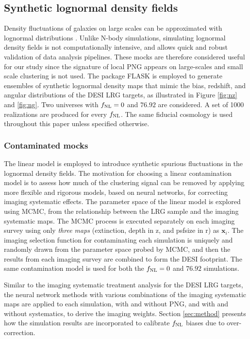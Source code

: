 \subsection{Synthetic lognormal density fields}\label{ssec:mocks}
Density fluctuations of galaxies on large scales can be approximated with lognormal distributions \citep{coles1991}. Unlike N-body simulations, simulating lognormal density fields is not computationally intensive, and allows quick and robust validation of data analysis pipelines. These mocks are therefore considered useful for our study since the signature of local PNG appears on large-scales and small scale clustering is not used. The package \textsc{FLASK} \citep[Full-sky Lognormal Astro-fields Simulation Kit;][]{Xavier_2016} is employed to generate ensembles of synthetic lognormal density maps that mimic the bias, redshift, and angular distributions of the DESI LRG targets, as illustrated in Figure \ref{fig:nz} and \ref{fig:ng}. Two universes with $f_{\rm NL}=0$ and $76.92$ are considered. A set of 1000 realizations are produced for every $f_{\rm NL}$.  The same fiducial cosmology is used throughout this paper unless specified otherwise. 

\subsubsection{Contaminated mocks}
The linear model is employed to introduce synthetic spurious fluctuations in the lognormal density fields. The motivation for choosing a linear contamination model is to assess how much of the clustering signal can be removed by applying more flexible and rigorous models, based on neural networks, for correcting imaging systematic effects. The parameter space of the linear model is explored using MCMC, from the relationship between the LRG sample and the imaging systematic maps. The MCMC process is executed separately on each imaging survey using only \textit{three maps} (extinction, depth in z, and psfsize in r) as $\textbf{x}_{i}$. The imaging selection function for contaminating each simulation is uniquely and randomly drawn from the parameter space probed by MCMC, and then the results from each imaging survey are combined to form the DESI footprint. The same contamination model is used for both the $f_{\rm NL}=0$ and $76.92$ simulations.

Similar to the imaging systematic treatment analysis for the DESI LRG targets, the neural network methods with various combinations of the imaging systematic maps are applied to each simulation, with and without PNG, and with and without systematics, to derive the imaging weights. Section \ref{sec:method} presents how the simulation results are incorporated to calibrate $f_{\rm NL}$ biases due to over-correction. 
